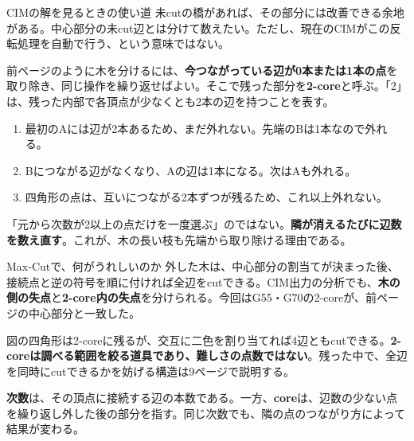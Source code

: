 \begin{point}{CIMの解を見るときの使い道}
未cutの橋があれば、その部分には改善できる余地がある。中心部分の未cut辺とは分けて数えたい。ただし、現在のCIMがこの反転処理を自動で行う、という意味ではない。
\end{point}

\newpage
{}
前ページのように木を分けるには、\textbf{今つながっている辺が0本または1本の点}を取り除き、同じ操作を繰り返せばよい。そこで残った部分を\textbf{2-core}と呼ぶ。「2」は、残った内部で各頂点が少なくとも2本の辺を持つことを表す。

\begin{enumerate}
\item 最初のAには辺が2本あるため、まだ外れない。先端のBは1本なので外れる。
\item Bにつながる辺がなくなり、Aの辺は1本になる。次はAも外れる。
\item 四角形の点は、互いにつながる2本ずつが残るため、これ以上外れない。
\end{enumerate}
「元から次数が2以上の点だけを一度選ぶ」のではない。\textbf{隣が消えるたびに辺数を数え直す}。これが、木の長い枝も先端から取り除ける理由である。

\begin{point}{Max-Cutで、何がうれしいのか}
外した木は、中心部分の割当てが決まった後、接続点と逆の符号を順に付ければ全辺をcutできる。CIM出力の分析でも、\textbf{木の側の失点}と\textbf{2-core内の失点}を分けられる。今回はG55・G70の2-coreが、前ページの中心部分と一致した。
\end{point}

図の四角形は2-coreに残るが、交互に二色を割り当てれば4辺ともcutできる。\textbf{2-coreは調べる範囲を絞る道具であり、難しさの点数ではない}。残った中で、全辺を同時にcutできるかを妨げる構造は9ページで説明する。

\newpage
{}
\textbf{次数}は、その頂点に接続する辺の本数である。一方、\textbf{core}は、辺数の少ない点を繰り返し外した後の部分を指す。同じ次数でも、隣の点のつながり方によって結果が変わる。

